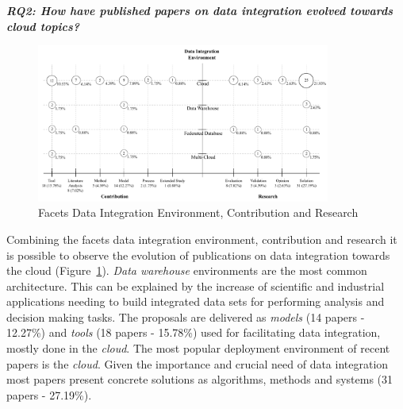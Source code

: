 \textbf{\textit{RQ2: How have published papers on data integration evolved towards cloud topics?}}
\begin{figure}[h]
\centering
\includegraphics[width=0.86\textwidth]{figs/bubble-charts/DI-Environment-Contribution-Research.pdf}
\caption{Facets Data Integration Environment, Contribution and Research}\label{fig:facet2}
\end{figure}

Combining the facets data integration environment, contribution
and research it is possible to observe  the evolution of publications on data integration towards the cloud (Figure~\ref{fig:facet2}).  {\em Data warehouse} environments are the most common architecture. This can be explained by the increase of scientific  and industrial applications needing to build integrated  data sets for performing analysis and decision making tasks. The proposals are delivered as {\em models}  (14  papers - 12.27\%)  and {\em tools} (18
papers - 15.78\%)  used for facilitating data integration, mostly done in the {\em cloud}.  The most popular deployment environment of recent papers is the {\em cloud}. Given the importance and crucial need of data integration  most papers present concrete solutions as algorithms, methods and systems (31 papers - 27.19\%).



